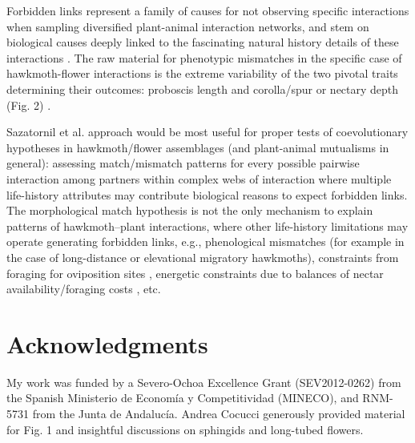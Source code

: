 \documentclass[a4paper,12pt]{article}
\begin{document}
Forbidden links represent a family of causes for not observing specific interactions when sampling diversified plant-animal interaction networks, and stem on biological causes deeply linked to the fascinating natural history details of these interactions \citep{BasJor:2014}. The raw material for phenotypic mismatches in the specific case of hawkmoth-flower interactions is the extreme variability of the two pivotal traits determining their outcomes: proboscis length and corolla/spur or nectary depth (Fig. 2) \citep{Cocucci:2009,Arditti:2012,Nilsson:1988,Miller:1997}. 

Sazatornil et al. approach would be most useful for proper tests of coevolutionary hypotheses in hawkmoth/flower assemblages (and plant-animal mutualisms in general): assessing match/mismatch patterns for every possible pairwise interaction among partners within complex webs of interaction where multiple life-history attributes may contribute biological reasons to expect forbidden links. The morphological match hypothesis is not the only mechanism to explain patterns of hawkmoth–plant interactions, where other life-history limitations may operate generating forbidden links, e.g., phenological mismatches (for example in the case of long-distance or elevational migratory hawkmoths), constraints from foraging for oviposition sites \citep{Alarcon:2008}, energetic constraints due to balances of nectar availability/foraging costs \citep{Borrell:2005}, etc.


\section*{Acknowledgments}

My work was funded by a Severo-Ochoa Excellence Grant (SEV2012-0262) from the Spanish Ministerio de Econom\'ia y Competitividad (MINECO), and RNM-5731 from the Junta de Andaluc\'ia. Andrea Cocucci generously provided material for Fig. 1 and insightful discussions on sphingids and long-tubed flowers.

\newpage

% 
\end{document}
